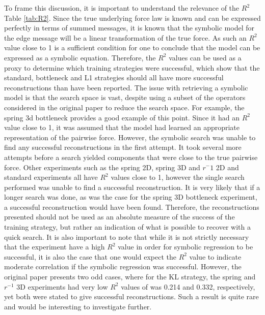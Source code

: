 \documentclass[11pt]{article}
\begin{document}
To frame this discussion, it is important to understand the relevance of the $R^2$ Table \ref{tab:R2}. Since the true underlying force law is known and can be expressed perfectly in terms of summed messages, it is known that the symbolic model for the edge message will be a linear transformation of the true force. As such an $R^2$ value close to 1 is a sufficient condition for one to conclude that the model can be expressed as a symbolic equation. Therefore, the $R^2$ values can be used as a proxy to determine which training strategies were successful, which show that the standard, bottleneck and L1 strategies should all have more successful reconstructions than have been reported. The issue with retrieving a symbolic model is that the search space is vast, despite using a subset of the operators considered in the original paper to reduce the search space. For example, the spring 3d bottleneck provides a good example of this point. Since it had an $R^2$ value close to 1, it was assumed that the model had learned an appropriate representation of the pairwise force. However, the symbolic search was unable to find any successful reconstructions in the first attempt. It took several more attempts before a search yielded components that were close to the true pairwise force. Other experiments such as the spring 2D, spring 3D and $r^-1$ 2D and standard experiments all have $R^2$ values close to 1, however the single search performed was unable to find a successful reconstruction. It is very likely that if a longer search was done, as was the case for the spring 3D bottleneck experiment, a successful reconstruction would have been found. Therefore, the reconstructions presented should not be used as an absolute measure of the success of the training strategy, but rather an indication of what is possible to recover with a quick search. It is also important to note that while it is not strictly necessary that the experiment have a high $R^2$ value in order for symbolic regression to be successful, it is also the case that one would expect the $R^2$ value to indicate moderate correlation if the symbolic regression was successful. However, the original paper presents two odd cases, where for the KL strategy, the spring and $r^{-1}$ 3D experiments had very low $R^2$ values of was 0.214 and 0.332, respectively, yet both were stated to give successful reconstructions. Such a result is quite rare and would be interesting to investigate further. 
\end{document}

